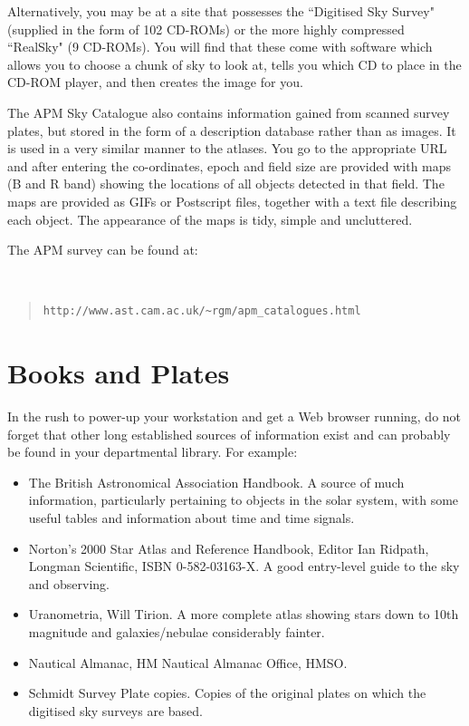 \documentclass[twoside,11pt]{article}
\newcommand{\htmladdnormallink}[2]{#1}
\newcommand{\xlabel}[1]{}
\newcommand{\APMref}{\htmladdnormallink{APM}{\tt http://www.ast.cam.ac.uk/\~{}rgm/apm_catalogues.html}}
\begin{document}
Alternatively, you may be at a site that possesses the ``Digitised
Sky Survey" (supplied in the form of 102 CD-ROMs) or the more highly compressed
``RealSky" (9 CD-ROMs). You will find that these come with software which
allows you to choose a chunk of sky to look at, tells you which CD to place in
the CD-ROM player, and then creates the image for you.

The {\APMref} Sky Catalogue also contains information gained from scanned survey plates, but
stored in the form of a description database rather than as images. It is used in a very similar manner to the atlases.
You go to the appropriate URL and after entering the co-ordinates, epoch and field size
are provided with maps (B and R band) showing the locations of all objects detected in that field.
The maps are provided as GIFs or Postscript files, together with a text file describing each object.
The appearance of the maps is tidy, simple and uncluttered.

The APM survey can be found at:

{\tt
\begin{quote}
\begin{verbatim}
http://www.ast.cam.ac.uk/~rgm/apm_catalogues.html
\end{verbatim}
\end{quote}
}

\section{Books and Plates} \xlabel{BOOKS}
\label{sec:books}

In the rush to power-up your workstation and get a Web browser
running, do not forget that other long established sources of information
exist and can probably be found in your departmental library.
For example:

\begin{itemize}
\item The British Astronomical Association Handbook.
A source of much information,
particularly pertaining to objects in the solar system, with some useful tables and
information about time and time signals.
\item Norton's 2000 Star Atlas and Reference Handbook, Editor Ian Ridpath, Longman Scientific,
ISBN 0-582-03163-X. A good entry-level guide to the sky and observing.
\item Uranometria, Will Tirion. A more complete atlas showing stars down to 10th
magnitude and galaxies/nebulae considerably fainter.
\item Nautical Almanac, HM Nautical Almanac Office, HMSO.
\item Schmidt Survey Plate copies. Copies of the original plates on which
the digitised sky surveys are based.
\end{itemize}
\end{document}
